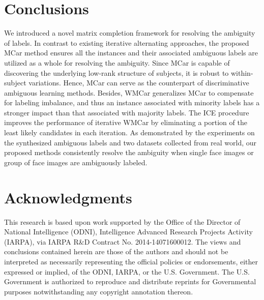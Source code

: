 \documentclass[10pt,journal,compsoc]{IEEEtran}
\begin{document}
\section{Conclusions}\label{Chapter_MCar:sec:Con}
We introduced a novel matrix completion framework for resolving the ambiguity of labels. In contrast to existing iterative alternating approaches, the proposed MCar method ensures all the instances and their associated ambiguous labels are utilized as a whole for resolving the ambiguity. Since MCar is capable of discovering the underlying low-rank structure of subjects, it is robust to within-subject variations. Hence, MCar can serve as the counterpart of discriminative ambiguous learning methods. Besides, WMCar generalizes MCar to compensate for labeling imbalance, and thus an instance associated with minority labels has a stronger impact than that associated with majority labels.
The ICE procedure improves the performance of iterative WMCar by eliminating a portion of the least likely candidates in each iteration.
As demonstrated by the experiments on the synthesized ambiguous labels and two datasets collected from real world, our proposed methods consistently resolve the ambiguity when single face images or group of face images are ambiguously labeled.


\section*{Acknowledgments}
This research is based upon work supported by the Office of the Director of National Intelligence (ODNI), Intelligence Advanced Research Projects
Activity (IARPA), via IARPA R\&D Contract No. 2014-14071600012. The views and conclusions contained herein are those of the authors and should
not be interpreted as necessarily representing the official policies or endorsements, either expressed or implied, of the ODNI, IARPA, or the U.S. Government. The U.S. Government is authorized to reproduce and distribute reprints for Governmental purposes notwithstanding any copyright annotation
thereon.


\IEEEdisplaynontitleabstractindextext



\IEEEpeerreviewmaketitle
\end{document}
